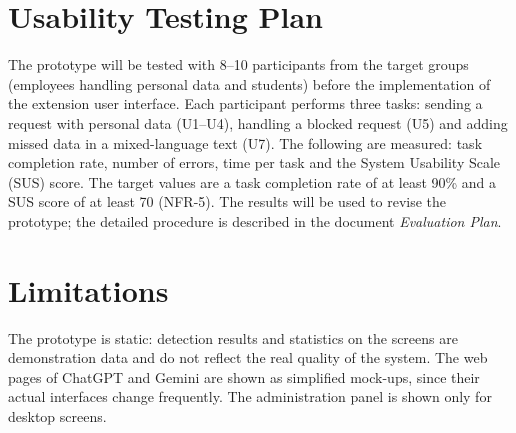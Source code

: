 \documentclass[12pt,a4paper]{article}
\begin{document}
\section{Usability Testing Plan}

The prototype will be tested with 8--10 participants from the target groups (employees handling personal data and students) before the implementation of the extension user interface. Each participant performs three tasks: sending a request with personal data (U1--U4), handling a blocked request (U5) and adding missed data in a mixed-language text (U7). The following are measured: task completion rate, number of errors, time per task and the System Usability Scale (SUS) score. The target values are a task completion rate of at least 90\% and a SUS score of at least 70 (NFR-5). The results will be used to revise the prototype; the detailed procedure is described in the document \emph{Evaluation Plan}.

\section{Limitations}

The prototype is static: detection results and statistics on the screens are demonstration data and do not reflect the real quality of the system. The web pages of ChatGPT and Gemini are shown as simplified mock-ups, since their actual interfaces change frequently. The administration panel is shown only for desktop screens.
\end{document}
